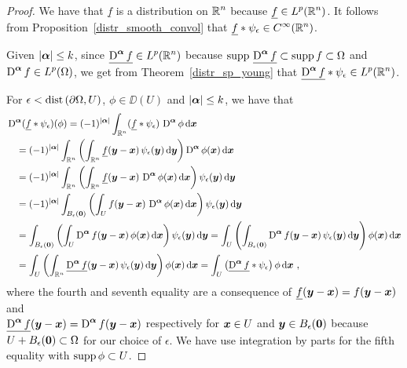 \begin{proof}
We have that $\underline{f}$ is a distribution on $\displaystyle \mathbb{R}^n$ because
$\displaystyle \underline{f} \in L^p(\mathbb{R}^n)$.
It follows from Proposition~\ref{distr_smooth_convol} that 
$\displaystyle \underline{f} \ast \psi_{\epsilon} \in C^\infty(\mathbb{R}^n)$.

Given $|{\bm{\alpha}}|\leq k$, since
$\displaystyle \underline{\operatorname{D}^{{\bm{\alpha}}} f} \in L^p(\mathbb{R}^n)$ because
$\displaystyle \operatorname{supp}\, \underline{\operatorname{D}^{{\bm{\alpha}}} f} \subset
\operatorname{supp} f \subset \Omega$ and
$\displaystyle \operatorname{D}^{{\bm{\alpha}}} f \in L^p(\Omega)$, we get from
Theorem~\ref{distr_sp_young} that
$\displaystyle \underline{\operatorname{D}^{{\bm{\alpha}}} f} \ast
\psi_\epsilon \in L^p(\mathbb{R}^n)$.

For $\epsilon < \mathrm{dist}\left(\partial \Omega,U\right)$, $\phi \in \DD(U)$ and
$|{\bm{\alpha}}|\leq k$, we have that
\begin{align*}
&\operatorname{D}^{{\bm{\alpha}}}(\underline{f} \ast \psi_\epsilon)(\phi)
= (-1)^{|{\bm{\alpha}}|} \int_{\mathbb{R}^n}
(\underline{f} \ast \psi_\epsilon)\, \operatorname{D}^{{\bm{\alpha}}} \phi \,\mathrm{d}{{\bm{x}}}  \\
&\quad = (-1)^{|{\bm{\alpha}}|} \int_{\mathbb{R}^n}
\left( \int_{\mathbb{R}^n} \underline{f}({\bm{y}}-{\bm{x}})\,
\psi_\epsilon ({\bm{y}}) \,\mathrm{d}{{\bm{y}}} \right) \operatorname{D}^{{\bm{\alpha}}} \phi({\bm{x}})
\,\mathrm{d}{{\bm{x}}} \\
&\quad = (-1)^{|{\bm{\alpha}}|} \int_{\mathbb{R}^n} \left( \int_{\mathbb{R}^n}
\underline{f}({\bm{y}}-{\bm{x}})\, \operatorname{D}^{{\bm{\alpha}}} \phi({\bm{x}}) \,\mathrm{d}{{\bm{x}}}
\right) \psi_\epsilon ({\bm{y}}) \,\mathrm{d}{{\bm{y}}} \\
&\quad = (-1)^{|{\bm{\alpha}}|} \int_{B_\epsilon({\bm{0}})}
\left( \int_{U} f({\bm{y}}-{\bm{x}})\,
\operatorname{D}^{{\bm{\alpha}}} \phi({\bm{x}}) \,\mathrm{d}{{\bm{x}}}
\right) \psi_\epsilon ({\bm{y}}) \,\mathrm{d}{{\bm{y}}} \\
&\quad = \int_{B_\epsilon({\bm{0}})} \left( \int_{U} \operatorname{D}^{{\bm{\alpha}}}
f({\bm{y}}-{\bm{x}})\, \phi({\bm{x}}) \,\mathrm{d}{{\bm{x}}}
\right) \psi_\epsilon ({\bm{y}}) \,\mathrm{d}{{\bm{y}}}
= \int_U \left( \int_{B_\epsilon({\bm{0}})} \operatorname{D}^{{\bm{\alpha}}}
f ({\bm{y}}-{\bm{x}})\,
\psi_\epsilon ({\bm{y}}) \,\mathrm{d}{{\bm{y}}} \right) \phi({\bm{x}}) \,\mathrm{d}{{\bm{x}}} \\
&\quad = \int_U \left( \int_{\mathbb{R}^n} \underline{\operatorname{D}^{{\bm{\alpha}}} f}
({\bm{y}}-{\bm{x}})\,
\psi_\epsilon ({\bm{y}}) \,\mathrm{d}{{\bm{y}}} \right) \phi({\bm{x}}) \,\mathrm{d}{{\bm{x}}}
= \int_{U} \left( \underline{\operatorname{D}^{{\bm{\alpha}}} f} \ast
\psi_\epsilon \right) \phi \,\mathrm{d}{{\bm{x}}} \ ,
\end{align*}
where the fourth and seventh equality are a consequence of
$\displaystyle \underline{f}({\bm{y}} - {\bm{x}}) = f({\bm{y}}-{\bm{x}})$
and\\
$\displaystyle \underline{\operatorname{D}^{{\bm{\alpha}}} f}({\bm{y}} - {\bm{x}})
= \operatorname{D}^{{\bm{\alpha}}} f({\bm{y}}-{\bm{x}})$ respectively 
for ${\bm{x}} \in U$ and ${\bm{y}} \in B_\epsilon({\bm{0}})$ because
$U + B_\epsilon({\bm{0}}) \subset \Omega$ for our choice of $\epsilon$.
We have use integration by parts for the fifth equality with
$\operatorname{supp} \phi \subset U$.


\end{proof}
